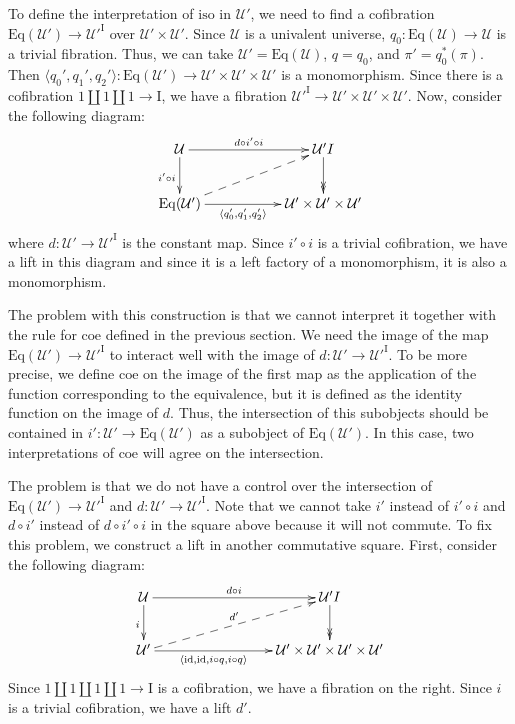\documentclass{amsart}
\theoremstyle{definition}
\theoremstyle{remark}
\newcommand{\fs}[1]{\mathrm{#1}}
\newcommand{\I}{\fs{I}}
\newcommand{\coe}{\fs{coe}}
\newcommand{\iso}{\fs{iso}}
\newcommand{\id}{\fs{id}}
\newcommand{\U}{\mathcal{U}}
\newcommand{\Eq}{\fs{Eq}}
\numberwithin{figure}{section}
\begin{document}
To define the interpretation of $\iso$ in $\U'$, we need to find a cofibration $\Eq(\U') \to \U'^\I$ over $\U' \times \U'$.
Since $\U$ is a univalent universe, $q_0 : \Eq(\U) \to \U$ is a trivial fibration.
Thus, we can take $\U' = \Eq(\U)$, $q = q_0$, and $\pi' = q_0^*(\pi)$.
Then $\langle q_0', q_1', q_2' \rangle : \Eq(\U') \to \U' \times \U' \times \U'$ is a monomorphism.
Since there is a cofibration $1 \amalg 1 \amalg 1 \to \I$, we have a fibration $\U'^\I \to \U' \times \U' \times \U'$.
Now, consider the following diagram:
\[ \xymatrix{ \U \ar[rr]^-{d \circ i' \circ i} \ar[d]_{i' \circ i}                  & & \U'^\I \ar@{->>}[d] \\
              \Eq(\U') \ar[rr]_-{\langle q_0', q_1', q_2' \rangle} \ar@{-->}[urr]   & & \U' \times \U' \times \U'
            } \]
where $d : \U' \to \U'^\I$ is the constant map.
Since $i' \circ i$ is a trivial cofibration, we have a lift in this diagram and since it is a left factory of a monomorphism, it is also a monomorphism.

The problem with this construction is that we cannot interpret it together with the rule for $\coe$ defined in the previous section.
We need the image of the map $\Eq(\U') \to \U'^\I$ to interact well with the image of $d : \U' \to \U'^\I$.
To be more precise, we define $\coe$ on the image of the first map as the application of the function corresponding to the equivalence, but it is defined as the identity function on the image of $d$.
Thus, the intersection of this subobjects should be contained in $i' : \U' \to \Eq(\U')$ as a subobject of $\Eq(\U')$.
In this case, two interpretations of $\coe$ will agree on the intersection.

The problem is that we do not have a control over the intersection of $\Eq(\U') \to \U'^\I$ and $d : \U' \to \U'^\I$.
Note that we cannot take $i'$ instead of $i' \circ i$ and $d \circ i'$ instead of $d \circ i' \circ i$ in the square above because it will not commute.
To fix this problem, we construct a lift in another commutative square.
First, consider the following diagram:
\[ \xymatrix{ \U \ar[rrr]^-{d \circ i} \ar[d]_{i}                                                   & & & \U'^\I \ar@{->>}[d] \\
              \U' \ar[rrr]_-{\langle \id, \id, i \circ q, i \circ q \rangle} \ar@{-->}[urrr]^{d'}   & & & \U' \times \U' \times \U' \times \U'
            } \]
Since $1 \amalg 1 \amalg 1 \amalg 1 \to \I$ is a cofibration, we have a fibration on the right.
Since $i$ is a trivial cofibration, we have a lift $d'$.
\end{document}
